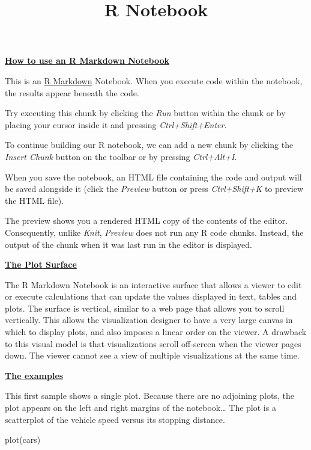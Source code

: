 \documentclass[
]{article}
\title{R Notebook}
\author{}
\date{\vspace{-2.5em}}
\newenvironment{Shaded}{\begin{snugshade}}{\end{snugshade}}
\newcommand{\FunctionTok}[1]{\textcolor[rgb]{0.00,0.00,0.00}{#1}}
\newcommand{\NormalTok}[1]{#1}
\begin{document}
\maketitle

\uline{\textbf{How to use an R Markdown Notebook}}

This is an \href{http://rmarkdown.rstudio.com}{R Markdown} Notebook.
When you execute code within the notebook, the results appear beneath
the code.

Try executing this chunk by clicking the \emph{Run} button within the
chunk or by placing your cursor inside it and pressing
\emph{Ctrl+Shift+Enter}.

To continue building our R notebook, we can add a new chunk by clicking
the \emph{Insert Chunk} button on the toolbar or by pressing
\emph{Ctrl+Alt+I}.

When you save the notebook, an HTML file containing the code and output
will be saved alongside it (click the \emph{Preview} button or press
\emph{Ctrl+Shift+K} to preview the HTML file).

The preview shows you a rendered HTML copy of the contents of the
editor. Consequently, unlike \emph{Knit}, \emph{Preview} does not run
any R code chunks. Instead, the output of the chunk when it was last run
in the editor is displayed.

\uline{\textbf{The Plot Surface}}

The R Markdown Notebook is an interactive surface that allows a viewer
to edit or execute calculations that can update the values displayed in
text, tables and plots. The surface is vertical, similar to a web page
that allows you to scroll vertically. This allows the visualization
designer to have a very large canvas in which to display plots, and also
imposes a linear order on the viewer. A drawback to this visual model is
that visualizations scroll off-screen when the viewer pages down. The
viewer cannot see a view of multiple visualizations at the same time.

\uline{\textbf{The examples}}

This first sample shows a single plot. Because there are no adjoining
plots, the plot appears on the left and right margins of the
notebook\ldots{} The plot is a scatterplot of the vehicle speed versus
its stopping distance.

\begin{Shaded}
\begin{Highlighting}[]
\FunctionTok{plot}\NormalTok{(cars)}
\end{Highlighting}
\end{Shaded}
\end{document}
